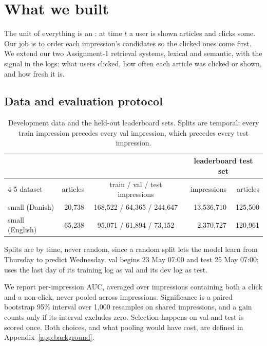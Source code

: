 \section{What we built}
\label{sec:system}

The unit of everything is an : at time $t$ a user is shown 
articles and clicks some. Our job is to order each impression's candidates so the clicked ones come
first. We extend our two Assignment-1 retrieval systems, lexical and semantic, with the
 signal in the logs: what users clicked, how often each article was clicked or
shown, and how fresh it is.

\subsection{Data and evaluation protocol}

\begin{table}[t]
\centering\footnotesize
\begin{tabular}{@{}lrcrr@{}}
\toprule
 & & & \multicolumn{2}{c}{leaderboard test set} \\
\cmidrule(l){4-5}
dataset & articles & train / val / test impressions & impressions & articles \\
\midrule
\eb{} small (Danish) & 20,738 & 168,522 / 64,365 / 244,647 & 13,536,710 & 125,500 \\
\mind{} small (English) & 65,238 & 95,071 / 61,894 / 73,152 & 2,370,727 & 120,961 \\
\bottomrule
\end{tabular}
\caption{Development data and the held-out leaderboard sets. Splits are temporal: every train
impression precedes every val impression, which precedes every test impression.}
\label{tab:data}
\end{table}

Splits are by time, never random, since a random split lets the model learn from Thursday to
predict Wednesday. \eb{} val begins 23 May 07:00 and test 25 May 07:00; \mind{} uses the last day
of its training log as val and its dev log as test.

We report per-impression AUC, averaged over impressions containing both a click and a non-click,
never pooled across impressions. Significance is a paired bootstrap 95\% interval over 1,000
resamples on shared impressions, and a gain counts only if its interval excludes zero. Selection
happens on val and test is scored once. Both choices, and what pooling would have cost, are defined
in Appendix~\ref{app:background}.

